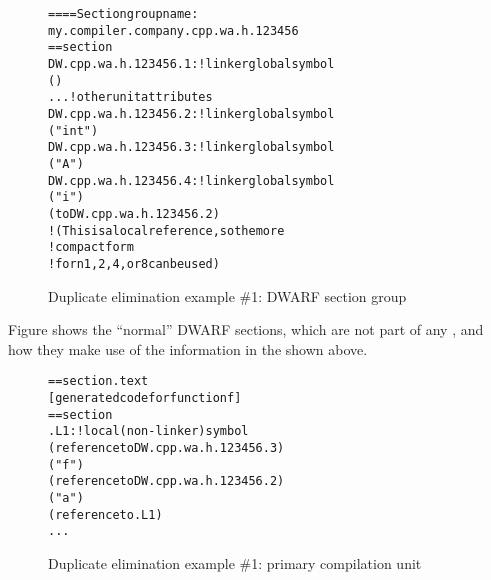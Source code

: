 \begin{figure}
\begin{dwflisting}
\begin{alltt}
==== Section group name:
    my.compiler.company.cpp.wa.h.123456
== section 
DW.cpp.wa.h.123456.1: ! linker global symbol
        ()
        ...  ! other unit attributes
DW.cpp.wa.h.123456.2: ! linker global symbol
        ("int")
DW.cpp.wa.h.123456.3: ! linker global symbol
        ("A")
DW.cpp.wa.h.123456.4: ! linker global symbol
        ("i")
        ( to DW.cpp.wa.h.123456.2)
            ! (This is a local reference, so the more
            ! compact form  
            ! for n 1,2,4, or 8 can be used)
\end{alltt}
\end{dwflisting}
\caption{Duplicate elimination example \#1: DWARF section group} 
\label{fig:duplicateeliminationexample1dwarfsectiongroup}
\end{figure}

Figure 
shows the ``normal'' DWARF sections, which are not part of
any , 
and how they make use of the information
in the  shown above.

\begin{figure}
\begin{dwflisting}
\begin{alltt}
== section .text
    [generated code for function f]
== section 
.L1:                   ! local (non-linker) symbol
            (reference to DW.cpp.wa.h.123456.3)
            ("f")
            (reference to DW.cpp.wa.h.123456.2)
                ("a")
                (reference to .L1)
        ...
\end{alltt}
\end{dwflisting}
\caption{Duplicate elimination example \#1: primary compilation unit} 
\label{fig:duplicateeliminationexample1primarycompilationunit}
\end{figure}

